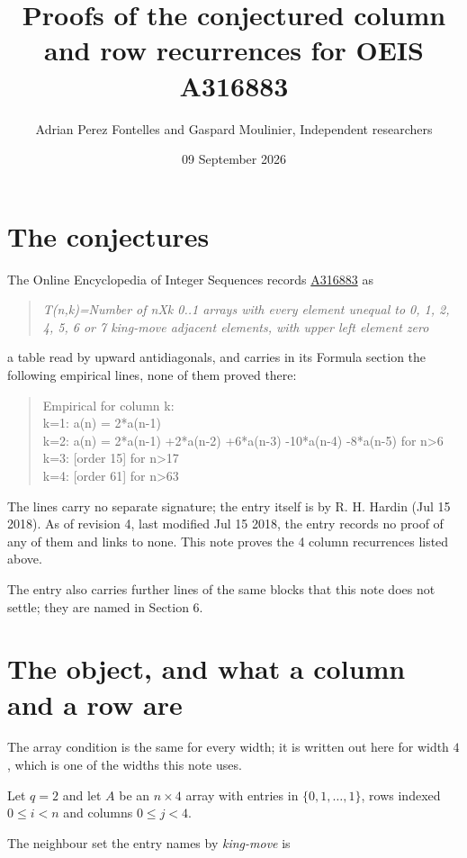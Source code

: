 \documentclass[11pt]{article}
\title{Proofs of the conjectured column and row recurrences for OEIS A316883}
\author{Adrian Perez Fontelles and Gaspard Moulinier, Independent researchers}
\date{09 September 2026}
\theoremstyle{definition}
\begin{document}
\maketitle
\section{The conjectures}

The Online Encyclopedia of Integer Sequences records \href{https://oeis.org/A316883}{A316883} as

\begin{quote}\itshape T(n,k)=Number of nXk 0..1 arrays with every element unequal to 0, 1, 2, 4, 5, 6 or 7 king-move adjacent elements, with upper left element zero\end{quote}

a table read by upward antidiagonals, and carries in its Formula section the following empirical lines, none of them proved there:

\begin{quote}\ttfamily Empirical for column k:\\
k=1: a(n) = 2*a(n-1)\\k=2: a(n) = 2*a(n-1) +2*a(n-2) +6*a(n-3) -10*a(n-4) -8*a(n-5) for n>6\\k=3: [order 15] for n>17\\k=4: [order 61] for n>63\end{quote}

The lines carry no separate signature; the entry itself is by R. H. Hardin (Jul 15 2018). As of revision 4, last modified Jul 15 2018, the entry records no proof of any of them and links to none. This note proves the 4 column recurrences listed above.

The entry also carries further lines of the same blocks that this note does not settle; they are named in Section 6.

\section{The object, and what a column and a row are}

The array condition is the same for every width; it is written out here for width $4$, which is one of the widths this note uses.

Let $q = 2$ and let $A$ be an $n \times 4$ array with entries in $\{0,1,\dots,1\}$, rows indexed $0 \le i < n$ and columns $0 \le j < 4$.

The neighbour set the entry names by {\itshape king-move} is
\end{document}
